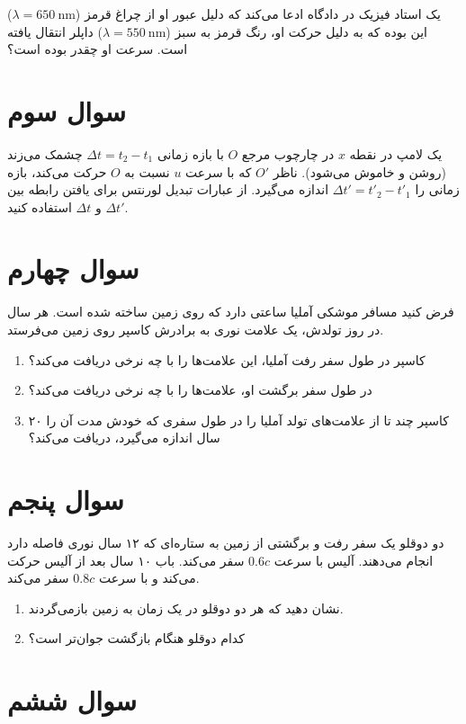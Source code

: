 \documentclass[a4paper,18pt]{article}
\begin{document}
	
	یک استاد فیزیک در دادگاه ادعا می‌کند که دلیل عبور او از چراغ قرمز ($\lambda = 650\ \mathrm{nm}$) این بوده که به دلیل حرکت او، رنگ قرمز به سبز ($\lambda = 550\ \mathrm{nm}$) داپلر انتقال یافته است. سرعت او چقدر بوده است؟
	\section{سوال سوم}
	
	یک لامپ در نقطه \( x \) در چارچوب مرجع \( O \) با بازه زمانی \( \Delta t = t_2 - t_1 \) چشمک می‌زند (روشن و خاموش می‌شود). ناظر \( O' \) که با سرعت \( u \) نسبت به \( O \) حرکت می‌کند، بازه زمانی را \( \Delta t' = t'_2 - t'_1 \) اندازه می‌گیرد. از عبارات تبدیل لورنتس برای یافتن رابطه بین \( \Delta t' \) و \( \Delta t \) استفاده کنید.
	
	\section{سوال چهارم}
	
	
	فرض کنید مسافر موشکی آملیا ساعتی دارد که روی زمین ساخته شده است. هر سال در روز تولدش، یک علامت نوری به برادرش کاسپر روی زمین می‌فرستد.
	
	\begin{enumerate}
		\item[(الف)] کاسپر در طول سفر رفت آملیا، این علامت‌ها را با چه نرخی دریافت می‌کند؟
		\item[(ب)] در طول سفر برگشت او، علامت‌ها را با چه نرخی دریافت می‌کند؟
		\item[(پ)] کاسپر چند تا از علامت‌های تولد آملیا را در طول سفری که خودش مدت آن را ۲۰ سال اندازه می‌گیرد، دریافت می‌کند؟
		\end{enumerate}
	\section{سوال پنجم}
	
	
	دو دوقلو یک سفر رفت و برگشتی از زمین به ستاره‌ای که ۱۲ سال نوری فاصله دارد انجام می‌دهند. آلیس با سرعت \(0.6c\) سفر می‌کند. باب ۱۰ سال بعد از آلیس حرکت می‌کند و با سرعت \(0.8c\) سفر می‌کند.
	
	\begin{enumerate}
		\item[(الف)] نشان دهید که هر دو دوقلو در یک زمان به زمین بازمی‌گردند.
		\item[(ب)] کدام دوقلو هنگام بازگشت جوان‌تر است؟
	\end{enumerate}
	
	\section{سوال ششم}
	
\end{document}
